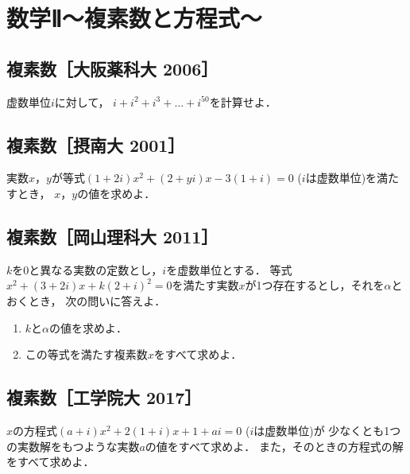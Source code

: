 \documentclass[../all/math-standard_questions_all.tex]{subfiles}
\begin{document}
\setlength{\abovedisplayskip}{2mm}
\setlength{\belowdisplayskip}{1mm}

\section{数学Ⅱ～複素数と方程式～}

\subsection{複素数［大阪薬科大 2006］}

虚数単位$i$に対して，
$i+i^2+i^3+ \dots +i^{50}$を計算せよ．

\vspace{2cm}
\vfill

\subsection{複素数［摂南大 2001］}

実数$x$，$y$が等式$(1+2i)x^2+(2+yi)x-3(1+i)=0$ ($i$は虚数単位)を満たすとき，
$x$，$y$の値を求めよ．

\vspace{2cm}
\vfill

\subsection{複素数［岡山理科大 2011］}

$k$を0と異なる実数の定数とし，$i$を虚数単位とする．
等式$x^2+(3+2i)x+k(2+i)^2=0$を満たす実数$x$が1つ存在するとし，それを$\alpha$とおくとき，
次の問いに答えよ．

\begin{enumerate}
    \item $k$と$\alpha$の値を求めよ．
    \item この等式を満たす複素数$x$をすべて求めよ．
\end{enumerate}

\vspace{2cm}
\vfill

\subsection{複素数［工学院大 2017］}

$x$の方程式$(a+i)x^2+2(1+i)x+1+ai=0$ ($i$は虚数単位)が
少なくとも1つの実数解をもつような実数$a$の値をすべて求めよ．
また，そのときの方程式の解をすべて求めよ．

\vspace{2cm}
\vfill
\end{document}
